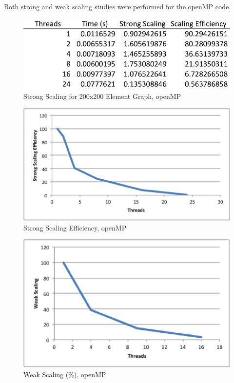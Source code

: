 \documentclass{article}
\begin{document}
Both strong and weak scaling studies were performed for the openMP code.

	\begin{figure}[h!]
		\begin{center}
			\includegraphics[width=0.5\columnwidth]{st_table_mp}
			\caption{Strong Scaling for 200x200 Element Graph, openMP}
			\label{mp_st_t}
		\end{center}
	\end{figure}
	
	\begin{figure}[h!]
		\begin{center}
			\includegraphics[width=0.7\columnwidth]{st_graph_mp}
			\caption{Strong Scaling Efficiency, openMP}
			\label{mp_st_g}
		\end{center}
	\end{figure}
	
	\begin{figure}[h!]
		\begin{center}
			\includegraphics[width=0.7\columnwidth]{wk_graph_mp}
			\caption{Weak Scaling (\%), openMP}
			\label{wk_mp_g}
		\end{center}
	\end{figure}
\end{document}
